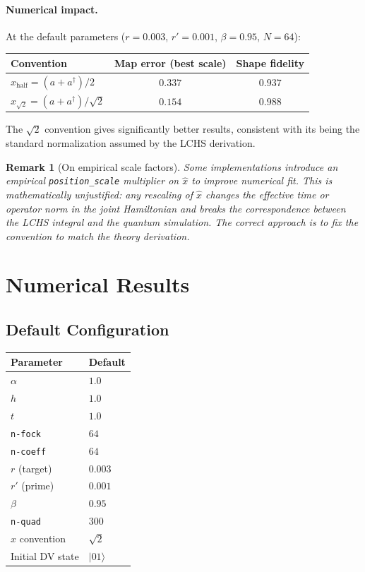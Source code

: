 \documentclass[11pt]{article}
\newtheorem{remark}{Remark}
\begin{document}
\paragraph{Numerical impact.}
At the default parameters ($r = 0.003$, $r' = 0.001$, $\beta = 0.95$,
$N = 64$):
\begin{center}
\begin{tabular}{lcc}
  \toprule
  Convention & Map error (best scale) & Shape fidelity \\
  \midrule
  $\hat{x}_{\text{half}} = (a+a^\dagger)/2$ & $0.337$ & $0.937$ \\
  $\hat{x}_{\sqrt{2}} = (a+a^\dagger)/\sqrt{2}$ & $\mathbf{0.154}$ & $\mathbf{0.988}$ \\
  \bottomrule
\end{tabular}
\end{center}

The $\sqrt{2}$ convention gives significantly better results, consistent with
its being the standard normalization assumed by the LCHS derivation.

\begin{remark}[On empirical scale factors]
Some implementations introduce an empirical \texttt{position\_scale} multiplier
on $\hat{x}$ to improve numerical fit.  This is mathematically unjustified:
any rescaling of $\hat{x}$ changes the effective time or operator norm in
the joint Hamiltonian and breaks the correspondence between the LCHS integral
and the quantum simulation.  The correct approach is to fix the convention
to match the theory derivation.
\end{remark}

\section{Numerical Results}

\subsection{Default Configuration}

\begin{center}
\begin{tabular}{ll}
  \toprule
  Parameter & Default \\
  \midrule
  $\alpha$ & $1.0$ \\
  $h$ & $1.0$ \\
  $t$ & $1.0$ \\
  \texttt{n-fock} & $64$ \\
  \texttt{n-coeff} & $64$ \\
  $r$ (target) & $0.003$ \\
  $r'$ (prime) & $0.001$ \\
  $\beta$ & $0.95$ \\
  \texttt{n-quad} & $300$ \\
  $\hat{x}$ convention & $\sqrt{2}$ \\
  Initial DV state & $|01\rangle$ \\
  \bottomrule
\end{tabular}
\end{center}
\end{document}
